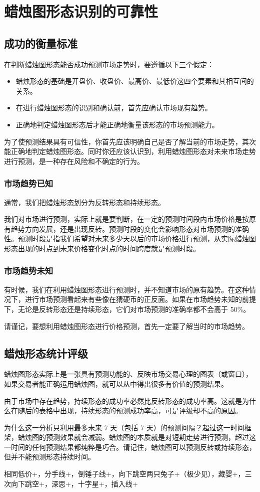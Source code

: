 \chapter{蜡烛图形态识别的可靠性}
\section{成功的衡量标准}
在判断蜡烛图形态能否成功预测市场走势时，要遵循以下三个假定：
\begin{itemize}
    \item 蜡烛形态的基础是开盘价、收盘价、最高价、最低价这四个要素和其相互间的关系。
    \item 在进行蜡烛图形态的识别和确认前，首先应确认市场现有趋势。
    \item 正确地判定蜡烛图形态后才能正确地衡量该形态的市场预测能力。
\end{itemize}
为了使预测结果具有可信性，你首先应该明确自己是否了解当前的市场走势，其次能正确地判定蜡烛图形态。同时你还应该认识到，利用蜡烛图形态对未来市场走势进行预测，是一种存在风险和不确定的行为。
\subsection{市场趋势已知}
通常，我们把蜡烛形态划分为反转形态和持续形态。

我们对市场进行预测，实际上就是要判断，在一定的预测时间段内市场价格是按原有趋势方向发展，还是出现反转。预测时段的变化会影响形态对市场预测的准确性。预测时段是指我们希望对未来多少天以后的市场价格进行预测，从实际蜡烛图形态出现的时点到未来价格变化时点的时间跨度就是预测时段。
\subsection{市场趋势未知}
有时候，我们在利用蜡烛图形态进行预测时，并不知道市场的原有趋势。在这种情况下，进行市场预测看起来有些像在猜硬币的正反面。如果在市场趋势未知的前提下，无论是反转形态还是持续形态，它们对市场预测的准确率都不会高于 50\%。

\begin{tcolorbox}
    请谨记，要想利用蜡烛图形态进行价格预测，首先一定要了解当时的市场趋势。
\end{tcolorbox}
\section{蜡烛形态统计评级}
蜡烛图形态实际上是一张具有预测功能的、反映市场交易心理的图表（或窗口），如果交易者能正确运用蜡烛图，就可以从中得出很多有价值的预测结果。

由于市场中存在趋势，持续形态的成功率必然比反转形态的成功率高。这就是为什么在随后的表格中出现，持续形态的预测成功率高，可是评级却不高的原因。

为什么这一分析只利用最多未来 7 天（包括 7 天）的预测间隔？超过这一时间框架，蜡烛图的预测效果就会减弱。蜡烛图的本质就是对短期走势进行预测，超过这一时间的任何预测结果都纯粹是巧合。请记住，蜡烛图可以预测反转或持续形态，但并不能预测形态持续时间。

\begin{tcolorbox}[title=重点注意]
    相同低价+，分手线+，倒锤子线+，向下跳空两只兔子+（极少见），藏婴+，三次向下跳空+，深思+，十字星+，插入线+
\end{tcolorbox}
